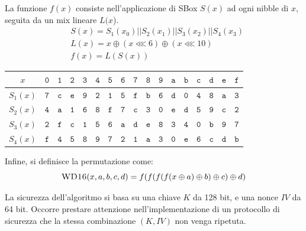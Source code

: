 \documentclass[target=bach,aauheader=,style=]{thud}
\begin{document}
			La funzione $f(x)$ consiste nell'applicazione di SBox $S(x)$ ad ogni nibble di $x$, seguita da un mix lineare $L(x$).
			\begin{align*}
				&S(x) = S_1(x_0) || S_2(x_1) || S_3(x_2) || S_4(x_3)\\
				&L(x) = x \oplus (x \lll 6) \oplus (x \lll 10)\\
				&f(x) = L(S(x))
			\end{align*}
			\begin{center}
				\begin{tabular}{|c|cccccccccccccccc|}
					\hline
					$x$ & $\mathtt{0}$ & $\mathtt{1}$ & $\mathtt{2}$ & $\mathtt{3}$ & $\mathtt{4}$ & $\mathtt{5}$ & $\mathtt{6}$ & $\mathtt{7}$ & $\mathtt{8}$ & $\mathtt{9}$ & $\mathtt{a}$ & $\mathtt{b}$ & $\mathtt{c}$ & $\mathtt{d}$ & $\mathtt{e}$ & $\mathtt{f}$\\
					\hline
					$S_1(x)$ & $\mathtt{7}$ & $\mathtt{c}$ & $\mathtt{e}$ & $\mathtt{9}$ & $\mathtt{2}$ & $\mathtt{1}$ & $\mathtt{5}$ & $\mathtt{f}$ & $\mathtt{b}$ & $\mathtt{6}$ & $\mathtt{d}$ & $\mathtt{0}$ & $\mathtt{4}$ & $\mathtt{8}$ & $\mathtt{a}$ & $\mathtt{3}$\\
					$S_2(x)$ & $\mathtt{4}$ & $\mathtt{a}$ & $\mathtt{1}$ & $\mathtt{6}$ & $\mathtt{8}$ & $\mathtt{f}$ & $\mathtt{7}$ & $\mathtt{c}$ & $\mathtt{3}$ & $\mathtt{0}$ & $\mathtt{e}$ & $\mathtt{d}$ & $\mathtt{5}$ & $\mathtt{9}$ & $\mathtt{c}$ & $\mathtt{2}$\\
					$S_3(x)$ & $\mathtt{2}$ & $\mathtt{f}$ & $\mathtt{c}$ & $\mathtt{1}$ & $\mathtt{5}$ & $\mathtt{6}$ & $\mathtt{a}$ & $\mathtt{d}$ & $\mathtt{e}$ & $\mathtt{8}$ & $\mathtt{3}$ & $\mathtt{4}$ & $\mathtt{0}$ & $\mathtt{b}$ & $\mathtt{9}$ & $\mathtt{7}$\\
					$S_4(x)$ & $\mathtt{f}$ & $\mathtt{4}$ & $\mathtt{5}$ & $\mathtt{8}$ & $\mathtt{9}$ & $\mathtt{7}$ & $\mathtt{2}$ & $\mathtt{1}$ & $\mathtt{a}$ & $\mathtt{3}$ & $\mathtt{0}$ & $\mathtt{e}$ & $\mathtt{6}$ & $\mathtt{c}$ & $\mathtt{d}$ & $\mathtt{b}$\\
					\hline
				\end{tabular}
			\end{center}
			
			Infine, si definisce la permutazione  come:
			\[\Call{WD16}{x,a,b,c,d} = f(f(f(f(x \oplus a)\oplus b)\oplus c)\oplus d)\]
			
			La sicurezza dell'algoritmo si basa su una chiave $K$ da 128 bit, e una nonce $IV$ da 64 bit. Occorre prestare attenzione nell'implementazione di un protocollo di sicurezza che la stessa combinazione $(K, IV)$ non venga ripetuta.
			
\end{document}
